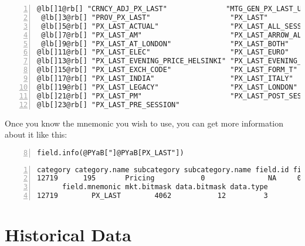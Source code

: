 \documentclass[a4paper]{article}
\begin{document}
\begin{Verbatim}[commandchars=@\[\],numbers=left,firstnumber=1,stepnumber=1]
 @lb[]1@rb[] "CRNCY_ADJ_PX_LAST"              "MTG_GEN_PX_LAST_UPDATE"        
 @lb[]3@rb[] "PROV_PX_LAST"                   "PX_LAST"                       
 @lb[]5@rb[] "PX_LAST_ACTUAL"                 "PX_LAST_ALL_SESSIONS"          
 @lb[]7@rb[] "PX_LAST_AM"                     "PX_LAST_ARROW_ALL_SESSION"     
 @lb[]9@rb[] "PX_LAST_AT_LONDON"              "PX_LAST_BOTH"                  
@lb[]11@rb[] "PX_LAST_ELEC"                   "PX_LAST_EURO"                  
@lb[]13@rb[] "PX_LAST_EVENING_PRICE_HELSINKI" "PX_LAST_EVENING_TRADE_HELSINKI"
@lb[]15@rb[] "PX_LAST_EXCH_CODE"              "PX_LAST_FORM_T"                
@lb[]17@rb[] "PX_LAST_INDIA"                  "PX_LAST_ITALY"                 
@lb[]19@rb[] "PX_LAST_LEGACY"                 "PX_LAST_LONDON"                
@lb[]21@rb[] "PX_LAST_PM"                     "PX_LAST_POST_SESSION"          
@lb[]23@rb[] "PX_LAST_PRE_SESSION"           
\end{Verbatim}

    

Once you know the mnemonic you wish to use, you can get more information about it like this:

\begin{Verbatim}[commandchars=@\[\],numbers=left,firstnumber=8,stepnumber=1]
field.info(@PYaB["]@PYaB[PX_LAST"])
\end{Verbatim}

    

\begin{Verbatim}[commandchars=@\[\],numbers=left,firstnumber=1,stepnumber=1]
      category category.name subcategory subcategory.name field.id field.name
12719      195       Pricing           0               NA     0560 Last Price
      field.mnemonic mkt.bitmask data.bitmask data.type
12719        PX_LAST        4062           12         3
\end{Verbatim}

    



\section{Historical Data} %
\label{sec:historical_data}



\end{document}
